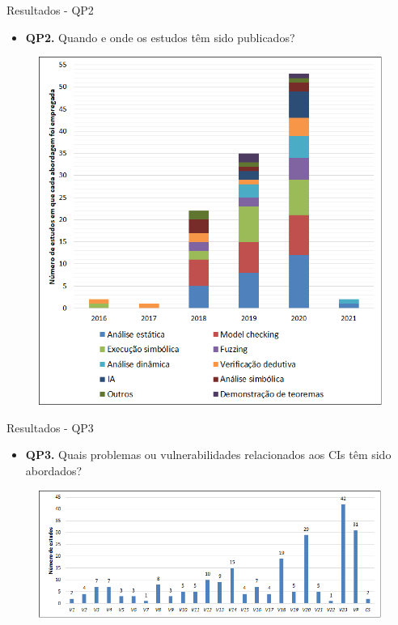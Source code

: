 \begin{frame}{Resultados - QP2}
    \begin{itemize}
        \item \textbf{QP2.} Quando e onde os estudos têm sido publicados?
    \end{itemize}
    \begin{figure}[!htb]
     \centering
     \includegraphics[scale=0.35]{figuras/metodologia/rq2-distribuicao-abordagens.png}
    \end{figure}
\end{frame}

\begin{frame}{Resultados - QP3}
    \begin{itemize}
        \item \textbf{QP3.} Quais problemas ou vulnerabilidades relacionados aos CIs têm sido abordados?
    \end{itemize}
    \begin{figure}[!htb]
     \centering
     \includegraphics[scale=0.55]{figuras/metodologia/rq3-vulnerabilidades.png}
    \end{figure}    
\end{frame}


